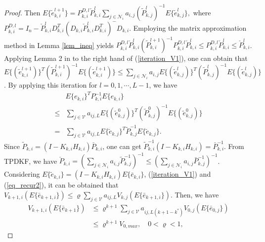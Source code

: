 \documentclass[journal,transmag]{IEEEtran}
\begin{document}
{\begin{proof}
	Then $E\{\tilde e_{k,i}^{l+1}\}=P_{k,i}^{D,l}\check P_{k,i}^l\sum_{j\in \mathcal{N}_{i}}a_{i,j}(\tilde P_{k,j}^l)^{-1}E\{\tilde e_{k,j}^{l}\},$
where $P_{k,i}^{D,l}= I_n-\check P_{k,i}^lD_{k,i}^T(D_{k,i}\check P_{k,i}^lD_{k,i}^T)^{-}D_{k,i}$. Employing the matrix approximation method in Lemma \ref{lem_ineq} yields $P_{k,i}^{D,l}\check P_{k,i}^l(\tilde P_{k,i}^{l+1})^{-1}P_{k,i}^{D,l}\check P_{k,i}^l\leq P_{k,i}^{D,l}\check P_{k,i}^l\leq \check P_{k,i}^l$.
Applying  Lemma 2 in \cite{Battistelli2014Kullback} to the right hand of  (\ref{iteration_V1}), one can obtain that
$E\{(\tilde e_{k,i}^{l+1})\}^T(\tilde P_{k,i}^{l+1})^{-1}E\{(\tilde e_{k,i}^{l+1})\}\leq \sum_{j\in \mathcal{N}_{i}}a_{i,j}E\{(\tilde e_{k,j}^{l})\}^T(\tilde P_{k,j}^{l})^{-1}E\{(\tilde e_{k,j}^{l})\}$.
By applying this iteration for $l=0,1,\cdots,L-1$, we have
\begin{align}\label{eq_recur2}
&E\{e_{k,i}\}^TP_{k,i}^{-1}E\{e_{k,i}\}\nonumber\\
\leq& \sum_{j\in \mathcal{V}}a_{ij,L}E\{(\tilde e_{k,j}^{0})\}^T(\tilde P_{k,j}^{0})^{-1}E\{(\tilde e_{k,j}^{0})\}\nonumber\\
=&\sum_{j\in \mathcal{V}}a_{ij,L}E\{\tilde e_{k,j}\}^T\tilde P_{k,j}^{-1}E\{\tilde e_{k,j}\}.
\end{align}
	Since $\tilde P_{k,i}=(I-K_{k,i}H_{k,i})\bar P_{k,i}$, one can get $\tilde P_{k,i}^{-1}(I-K_{k,i}H_{k,i})=\bar P_{k,i}^{-1}$.
	From TPDKF, we have $\check P_{k,i}=(\sum_{j\in \mathcal{N}_{i}}a_{i,j}\tilde P_{k,j}^{-1})^{-1}\leq (\sum_{j\in \mathcal{N}_{i}}a_{i,j}\bar P_{k,j}^{-1})^{-1}$. Considering $E\{\tilde e_{k,i}\}=(I-K_{k,i}H_{k,i})E\{\bar e_{k,i}\}$, (\ref{iteration_V1})  and (\ref{eq_recur2}), it can be obtained that
	$V_{k+1,i}(E\{\bar e_{k+1,i}\})\leq\varrho\sum_{j\in \mathcal{V}}a_{ij,L}V_{k,j}(E\{\bar e_{k+1,i}\}).$
	Then, we have 
			\begin{align}\label{V_ineq_final6}
			V_{k+1,i}(E\{\bar e_{k+1}\})&\leq \varrho^{k+1}\sum_{j\in \mathcal{V}}a_{ij,L(k+1-k^*)}V_{0,j}(E\{\bar e_{0,j}\})\nonumber\\
			&\leq \varrho^{k+1}V_{0,max}, \quad 0<\varrho<1,

\end{align}
\end{proof}}
\end{document}
